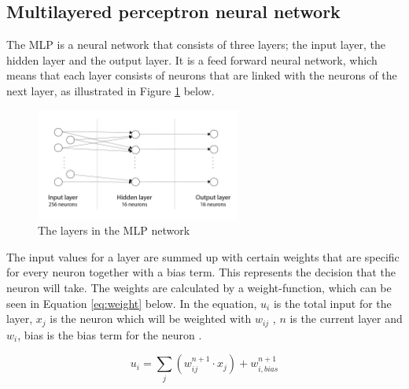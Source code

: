 \documentclass[12pt]{report}
\begin{document}
\subsection*{Multilayered perceptron neural network}

The MLP is a neural network that consists of three layers; the input layer, the hidden layer and the output layer.  It is a feed forward neural network, which means that each layer consists of neurons that are linked with the neurons of the next layer, as illustrated in Figure \ref{fig:layers} below.

\begin{figure}[!ht]
	\centering
	\includegraphics[width=0.6\textwidth]{Images/mlp_layers.png}
	\caption{\label{fig:layers} The layers in the MLP network}
	\centering
\end{figure}
The input values for a layer are summed up with certain weights that are specific for every neuron together with a bias term. This represents the decision that the neuron will take. The weights are calculated by a weight-function, which can be seen in Equation \ref{eq:weight} below. In the equation, $u_i$ is the total input for the layer, $x_j$  is the neuron which will be weighted with $w_{ij}$ , $n$ is the current layer and  $w_i$, bias is the bias term for the neuron \cite{mlp}. 

\begin{equation}
  \label{eq:weight}
  u_{i}=\sum_{j}(w_{ij}^{n+1}\cdot x_{j}) + w_{i,bias}^{n+1}
\end{equation}
\end{document}
